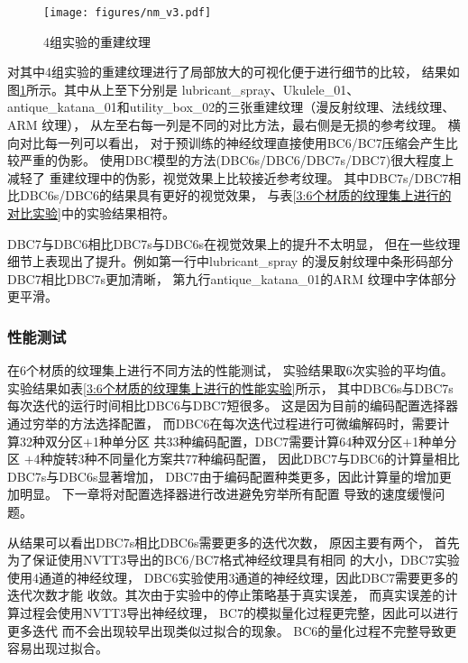 \begin{figure}[htbp]
    \centering
    \texttt{[image: figures/nm\_v3.pdf]}
    \caption{4组实验的重建纹理}
    \label{fig:nm_v3}
\end{figure}

对其中4组实验的重建纹理进行了局部放大的可视化便于进行细节的比较，
结果如图\ref{fig:nm_v3}所示。其中从上至下分别是
lubricant\_spray、Ukulele\_01、
antique\_katana\_01和utility\_box\_02的三张重建纹理（漫反射纹理、法线纹理、ARM 纹理），
从左至右每一列是不同的对比方法，最右侧是无损的参考纹理。
横向对比每一列可以看出，
对于预训练的神经纹理直接使用BC6/BC7压缩会产生比较严重的伪影。
使用DBC模型的方法(DBC6s/DBC6/DBC7s/DBC7)很大程度上减轻了
重建纹理中的伪影，视觉效果上比较接近参考纹理。
其中DBC7s/DBC7相比DBC6s/DBC6的结果具有更好的视觉效果，
与表\ref{3:6个材质的纹理集上进行的对比实验}中的实验结果相符。

DBC7与DBC6相比DBC7s与DBC6s在视觉效果上的提升不太明显，
但在一些纹理细节上表现出了提升。例如第一行中lubricant\_spray
的漫反射纹理中条形码部分DBC7相比DBC7s更加清晰，
第九行antique\_katana\_01的ARM 纹理中字体部分
更平滑。


\subsubsection{性能测试}
\label{3:性能测试}
在6个材质的纹理集上进行不同方法的性能测试，
实验结果取6次实验的平均值。
实验结果如表\ref{3:6个材质的纹理集上进行的性能实验}所示，
其中DBC6s与DBC7s每次迭代的运行时间相比DBC6与DBC7短很多。
这是因为目前的编码配置选择器通过穷举的方法选择配置，
而DBC6在每次迭代过程进行可微编解码时，需要计算32种双分区$+$1种单分区
共33种编码配置，DBC7需要计算64种双分区$+$1种单分区
$+$4种旋转\times3种不同量化方案共77种编码配置，
因此DBC7与DBC6的计算量相比DBC7s与DBC6s显著增加，
DBC7由于编码配置种类更多，因此计算量的增加更加明显。
下一章将对配置选择器进行改进避免穷举所有配置
导致的速度缓慢问题。

从结果可以看出DBC7s相比DBC6s需要更多的迭代次数，
原因主要有两个，
首先为了保证使用NVTT3导出的BC6/BC7格式神经纹理具有相同
的大小，DBC7实验使用4通道的神经纹理，
DBC6实验使用3通道的神经纹理，因此DBC7需要更多的迭代次数才能
收敛。其次由于实验中的停止策略基于真实误差，
而真实误差的计算过程会使用NVTT3导出神经纹理，
BC7的模拟量化过程更完整，因此可以进行更多迭代
而不会出现较早出现类似过拟合的现象。
BC6的量化过程不完整导致更容易出现过拟合。

